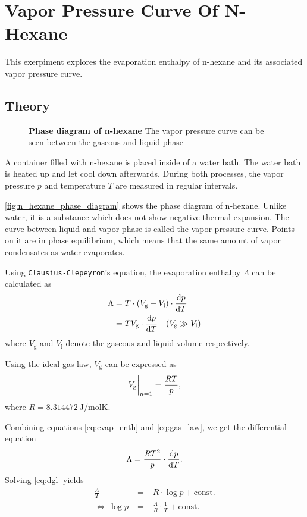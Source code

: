 \chapter{Vapor Pressure Curve Of N-Hexane}
This exerpiment explores the evaporation enthalpy of n-hexane and its associated vapor pressure curve.

\section{Theory}
\begin{figure}[tbp]
	\centering
	\caption{\textbf{Phase diagram of n-hexane} The vapor pressure curve can be seen between the gaseous and liquid phase}
	\label{fig:n_hexane_phase_diagram}
\end{figure}

A container filled with n-hexane is placed inside of a water bath.
The water bath is heated up and let cool down afterwards.
During both processes, the vapor pressure $p$ and temperature $T$ are measured in regular intervals.

\autoref{fig:n_hexane_phase_diagram} shows the phase diagram of n-hexane.
Unlike water, it is a substance which does not show negative thermal expansion.
The curve between liquid and vapor phase is called the vapor pressure curve.
Points on it are in phase equilibrium, which means that the same amount of vapor condensates as water evaporates.

Using \texttt{Clausius-Clepeyron}'s equation, the evaporation enthalpy $\Lambda$ can be calculated as
\begin{align}\label{eq:evap_enth}
	\Lambda&=T\cdot\left(V_\text{g}-V_\text{l}\right)\cdot\frac{\d p}{\d T} \nonumber \\
	&=TV_\text{g}\cdot\frac{\d p}{\d T}\quad(V_\text{g}\gg V_\text{l})
\end{align}
where $V_\text{g}$ and $V_\text{l}$ denote the gaseous and liquid volume respectively.

Using the ideal gas law, $V_\text{g}$ can be expressed as
\begin{equation}\label{eq:gas_law}
	V_\text{g}\at[\bigg]{n=1}=\frac{RT}{p},
\end{equation}
where $R=\SI{8.314472}{\joule\per\mole\kelvin}$.

Combining equations \ref{eq:evap_enth} and \ref{eq:gas_law}, we get the differential equation
\begin{equation}\label{eq:dgl}
	\Lambda=\frac{RT^2}{p}\cdot\frac{\d p}{\d T}.
\end{equation}
Solving \autoref{eq:dgl} yields
\begin{align}
	\frac{\Lambda}{T}&=-R\cdot\log{p}+\text{const.} \nonumber \\
	\Leftrightarrow\ \log{p}&=-\frac{\Lambda}{R}\cdot \frac{1}{T} + \text{const.}	\label{eq:fit_eq}
\end{align}

